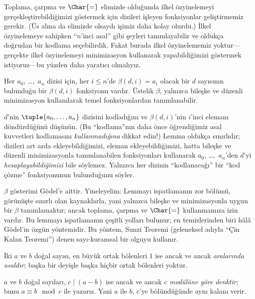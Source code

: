 \documentclass[../../../include/open-logic-section]{subfiles}
\begin{document}


Toplama, çarpma ve $\Char{=}$ elimizde olduğunda ilkel özyinelemeyi
gerçekleştirebildiğimizi göstermek için dizileri işleyen fonksiyonlar
geliştirmemiz gerekir. (Üs alma da elimizde olsaydı işimiz daha kolay
olurdu.) İlkel özyinelemeye sahipken ``$n$'inci asal'' gibi şeyleri
tanımlayabilir ve oldukça doğrudan bir kodlama seçebilirdik. Fakat burada
ilkel özyinelememiz yoktur---gerçekte ilkel özyinelemeyi minimizasyon
kullanarak yapabildiğimizi göstermek istiyoruz---bu yüzden daha yaratıcı
olmalıyız.

\begin{lem}
Her $a_0$, \dots,~$a_n$ dizisi için, her $i\le n$'de
$\beta(d,i)=a_i$ olacak bir $d$ sayısının bulunduğu bir $\beta(d,i)$
fonksiyonu vardır. Üstelik $\beta$, yalnızca bileşke ve düzenli minimizasyon
kullanılarak temel fonksiyonlardan tanımlanabilir.
\end{lem}

$d$'nin $\tuple{a_0,\dots,a_n}$ dizisini kodladığını ve $\beta(d,i)$'nin
$i$'inci elemanı döndürdüğünü düşünün. (Bu ``kodlama''nın daha önce
öğrendiğimiz asal kuvvetleri kodlamasını \emph{kullanmadığına} dikkat edin!)
Lemma oldukça sınırlıdır; dizileri art arda ekleyebildiğimizi, eleman
ekleyebildiğimizi, hatta bileşke ve düzenli minimizasyonla tanımlanabilen
fonksiyonları kullanarak $a_0$, \dots,~$a_n$'den $d$'yi
\emph{hesaplayabildiğimizi} bile söylemez. Yalnızca her dizinin
``kodlanacağı'' bir ``kod çözme'' fonksiyonunun bulunduğunu söyler.

$\beta$ gösterimi G\"odel'e aittir. Yineleyelim: Lemmayı ispatlamanın zor
bölümü, görünüşte sınırlı olan kaynaklarla, yani yalnızca bileşke ve
minimizasyonla uygun bir $\beta$ tanımlamaktır; ancak toplama, çarpma ve
$\Char{=}$ kullanmamıza izin vardır. Bu lemmayı ispatlamanın çeşitli yolları
bulunur; en temizlerinden biri hâlâ G\"odel'in özgün yöntemidir. Bu yöntem,
Sunzi Teoremi (geleneksel adıyla ``Çin Kalan Teoremi'') denen sayı-kuramsal
bir olguyu kullanır.

\begin{defn}
İki $a$ ve $b$ doğal sayısı, en büyük ortak bölenleri $1$ ise ancak ve ancak
\emph{aralarında asaldır}; başka bir deyişle başka hiçbir ortak bölenleri
yoktur.
\end{defn}

\begin{defn}
$a$ ve $b$ doğal sayıları, $c\mid(a-b)$ ise ancak ve ancak
\emph{$c$ modülüne göre denktir}; bunu $a\equiv b\mod c$ ile yazarız. Yani
$a$ ile $b$, $c$'ye bölündüğünde aynı kalanı verir.
\end{defn}
\end{document}
